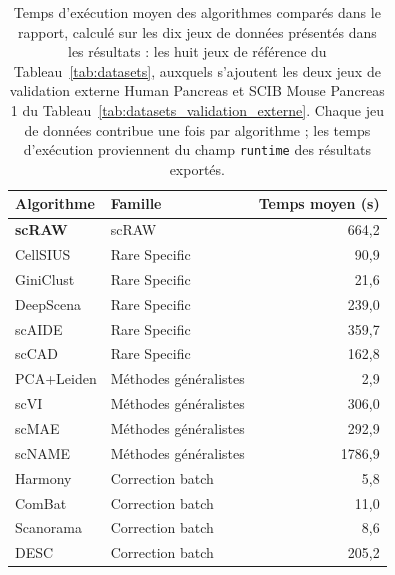 \begin{table}[H]
\centering
\scriptsize
\renewcommand{\arraystretch}{1.12}
\begin{tabularx}{\textwidth}{@{}p{}Xr@{}}
\toprule
\textbf{Algorithme} & \textbf{Famille} & \textbf{Temps moyen (s)} \\
\midrule
\textbf{scRAW} & scRAW & 664,2 \\
CellSIUS & Rare Specific & 90,9 \\
GiniClust & Rare Specific & 21,6 \\
DeepScena & Rare Specific & 239,0 \\
scAIDE & Rare Specific & 359,7 \\
scCAD & Rare Specific & 162,8 \\
PCA+Leiden & Méthodes généralistes & 2,9 \\
scVI & Méthodes généralistes & 306,0 \\
scMAE & Méthodes généralistes & 292,9 \\
scNAME & Méthodes généralistes & 1786,9 \\
Harmony & Correction batch & 5,8 \\
ComBat & Correction batch & 11,0 \\
Scanorama & Correction batch & 8,6 \\
DESC & Correction batch & 205,2 \\
\bottomrule
\end{tabularx}
\caption{Temps d'exécution moyen des algorithmes comparés dans le rapport, calculé sur les dix jeux de données présentés dans les résultats : les huit jeux de référence du Tableau~\ref{tab:datasets}, auxquels s'ajoutent les deux jeux de validation externe Human Pancreas et SCIB Mouse Pancreas 1 du Tableau~\ref{tab:datasets_validation_externe}. Chaque jeu de données contribue une fois par algorithme ; les temps d'exécution proviennent du champ \texttt{runtime} des résultats exportés.}
\label{tab:runtime_moyen_algorithmes}
\end{table}

